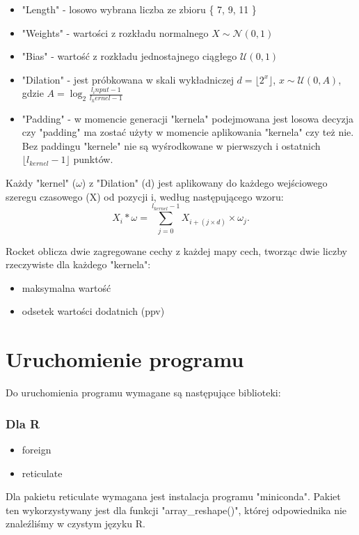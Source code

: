 \documentclass[12pt]{article}
\begin{document}
\begin{itemize}
  \item "Length" - losowo wybrana liczba ze zbioru \{ 7, 9, 11 \}
  \item "Weights" - wartości z rozkładu normalnego $X \sim \mathcal{N}(0,1)$
  \item "Bias" - wartość z rozkładu jednostajnego ciągłego $\mathcal{U}(0,1)$
  \item "Dilation" - jest próbkowana w skali wykładniczej $d=\lfloor2^x\rfloor$, $x \sim \mathcal{U}(0,A)$, gdzie $A=\log_2\frac{l_input-1}{l_kernel-1}$
  \item "Padding" - w momencie generacji "kernela" podejmowana jest losowa decyzja czy "padding" ma zostać użyty w momencie aplikowania "kernela" czy też nie. Bez paddingu "kernele" nie są wyśrodkowane w pierwszych i ostatnich $ \lfloor l_{kernel} - 1 \rfloor $ punktów.
\end{itemize}

Każdy "kernel" ($\omega$) z "Dilation" (d) jest aplikowany do każdego wejściowego szeregu czasowego (X) od pozycji i, według następującego wzoru: 
$$X_{i} * \omega =  \sum_{j=0}^{l_{kernel} - 1} X_{i + (j \times	d)} \times	\omega_{j}. $$ 

Rocket oblicza dwie zagregowane cechy z każdej mapy cech, tworząc
dwie liczby rzeczywiste dla każdego "kernela":

\begin{itemize}
  \item maksymalna wartość
  \item odsetek wartości dodatnich (ppv) 
\end{itemize}

\section{Uruchomienie programu}
Do uruchomienia programu wymagane są następujące biblioteki:

\subsubsection*{Dla R}
\begin{itemize}
  \item foreign
  \item reticulate
\end{itemize}

Dla pakietu reticulate wymagana jest instalacja programu "miniconda". Pakiet ten wykorzystywany jest dla funkcji "array\_reshape()", której odpowiednika nie znaleźliśmy w czystym języku R.
\end{document}
